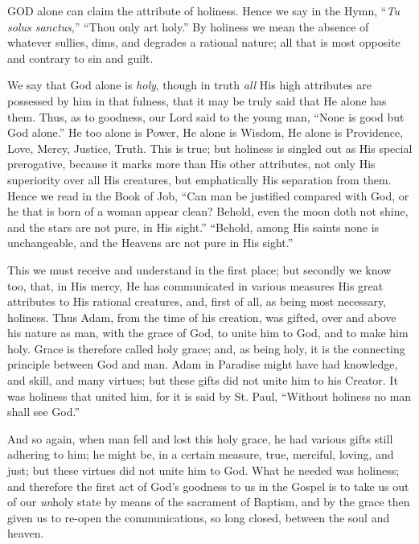 

GOD
alone can claim the attribute of holiness. Hence we say in the Hymn, ``\emph{Tu
solus sanctus},'' ``Thou only art holy.'' By holiness we mean the
absence of whatever sullies, dims, and degrades a rational nature; all
that is most opposite and contrary to sin and guilt.

We say that God alone is \emph{holy},
though in truth \emph{all} His high attributes are possessed by him in
that fulness, that it may be truly said that He alone has them. Thus, as
to goodness, our Lord said to the young man, ``None is good but God
alone.'' He too alone is Power, He alone is Wisdom, He alone is
Providence, Love, Mercy, Justice, Truth. This is true; but holiness is
singled out as His special prerogative, because it marks more than His
other attributes, not only His superiority over all His creatures, but
emphatically His separation from them. Hence we read in the Book of Job,
``Can man be justified compared with God, or he that is born of a
woman appear clean? Behold, even the moon doth not shine, and the stars
are not pure, in His sight.'' ``Behold, among His saints none is
unchangeable, and the Heavens arc not pure in His sight.''

This we must receive and
understand in the first place; but secondly we know too, that, in His
mercy, He has communicated in various measures His great attributes to
His rational creatures, and, first of all, as being most necessary,
holiness. Thus Adam, from the time of his creation, was gifted, over and
above his nature as man, with the grace of God, to unite him to God, and
to make him holy. Grace is therefore called holy grace; and, as being
holy, it is the connecting principle between God and man. Adam in
Paradise might have had knowledge, and skill, and many virtues; but
these gifts did not unite him to his Creator. It was holiness that
united him, for it is said by St. Paul, ``Without holiness no man shall
see God.''

And so again, when man fell and
lost this holy grace, he had various gifts still adhering to him; he
might be, in a certain measure, true, merciful, loving, and just; but
these virtues did not unite him to God. What he needed was holiness; and
therefore the first act of God's goodness to us in the Gospel is to take
us out of our \emph{un}holy state by means of the sacrament of Baptism,
and by the grace then given us to re-open the communications, so long
closed, between the soul and heaven.

